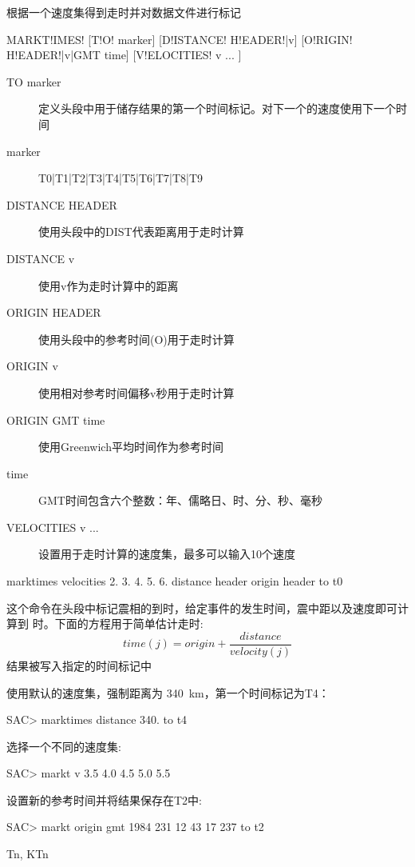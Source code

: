 \label{cmd:marktimes}

根据一个速度集得到走时并对数据文件进行标记

\begin{SACSTX}
MARKT!IMES! [T!O! marker] [D!ISTANCE! H!EADER!|v] [O!RIGIN! H!EADER!|v|GMT time]
    [V!ELOCITIES! v ... ]
\end{SACSTX}

\begin{description}
\item [TO marker] 定义头段中用于储存结果的第一个时间标记。对下一个的速度使用下一个时间
\item [marker]  T0|T1|T2|T3|T4|T5|T6|T7|T8|T9
\item [DISTANCE HEADER] 使用头段中的DIST代表距离用于走时计算
\item [DISTANCE v] 使用v作为走时计算中的距离
\item [ORIGIN HEADER] 使用头段中的参考时间(O)用于走时计算
\item [ORIGIN v] 使用相对参考时间偏移v秒用于走时计算
\item [ORIGIN GMT time] 使用Greenwich平均时间作为参考时间
\item [time] GMT时间包含六个整数：年、儒略日、时、分、秒、毫秒
\item [VELOCITIES v ... ] 设置用于走时计算的速度集，最多可以输入10个速度
\end{description}

\begin{SACDFT}
marktimes velocities 2. 3. 4. 5. 6. distance
    header origin header to t0
\end{SACDFT}

这个命令在头段中标记震相的到时，给定事件的发生时间，震中距以及速度即可计算到	时。下面的方程用于简单估计走时:
 		\[ time(j) = origin + \frac{distance}{velocity(j)} \]
结果被写入指定的时间标记中

使用默认的速度集，强制距离为 \SI{340}{\km}，第一个时间标记为T4：
\begin{SACCode}
SAC> marktimes distance 340. to t4
\end{SACCode}

选择一个不同的速度集:
\begin{SACCode}
SAC> markt v 3.5 4.0 4.5 5.0 5.5
\end{SACCode}

设置新的参考时间并将结果保存在T2中:
\begin{SACCode}
SAC> markt origin gmt 1984 231 12 43 17 237 to t2
\end{SACCode}

Tn, KTn
